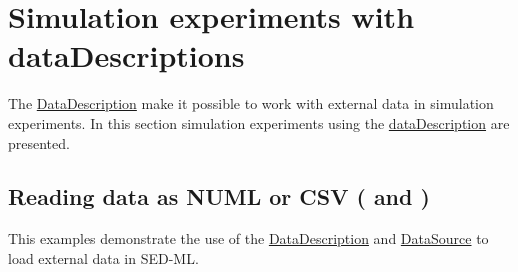 \section{Simulation experiments with dataDescriptions}
The \hyperref[class:dataDescription]{DataDescription} make it possible to work with external data in simulation experiments. In this section simulation experiments using the \hyperref[class:dataDescription]{dataDescription} are presented.

\subsection{Reading data as NUML or CSV ( and )}
This examples demonstrate the use of the \hyperref[class:dataDescription]{DataDescription} and \hyperref[class:dataSource]{DataSource} to load external data in SED-ML. 

